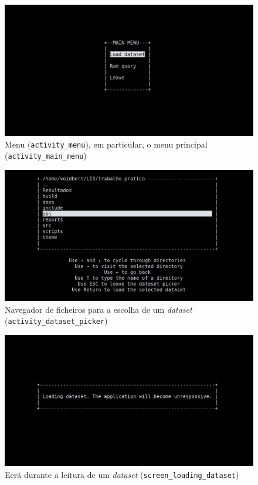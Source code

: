 \documentclass[12pt, a4paper]{article}
\begin{document}
\begin{figure}[ht]
    \centering
    \includegraphics[scale=0.25]{res-fase2/interactive_screenshots/main_menu.png}
	\caption{Menu (\texttt{activity\_menu}), em particular, o menu principal
	         (\texttt{activity\_main\_menu})}
    \label{fig:main_menu}
\end{figure}

\begin{figure}[ht]
    \centering
    \includegraphics[scale=0.25]{res-fase2/interactive_screenshots/dataset_picker.png}
	\caption{Navegador de ficheiros para a escolha de um \emph{dataset}
	         (\texttt{activity\_dataset\_picker})}
    \label{fig:dataset_picker}
\end{figure}

\begin{figure}[ht]
    \centering
    \includegraphics[scale=0.25]{res-fase2/interactive_screenshots/loading_dataset.png}
	\caption{Ecrã durante a leitura de um \emph{dataset} (\texttt{screen\_loading\_dataset})}
    \label{fig:loading_dataset}
\end{figure}
\end{document}
